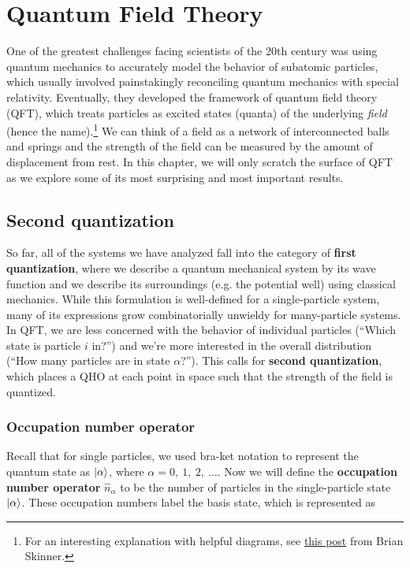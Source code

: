 %

%

\chapter{Quantum Field Theory} \label{ch:qft}
One of the greatest challenges facing scientists of the 20th century was using quantum mechanics to accurately model the behavior of subatomic particles, which usually involved painstakingly reconciling quantum mechanics with special relativity. Eventually, they developed the framework of quantum field theory (QFT), which treats particles as excited states (quanta) of the underlying \emph{field} (hence the name).\footnote{For an interesting explanation with helpful diagrams, see \href{https://www.ribbonfarm.com/2015/08/20/qft/}{this post} from Brian Skinner.} We can think of a field as a network of interconnected balls and springs and the strength of the field can be measured by the amount of displacement from rest. In this chapter, we will only scratch the surface of QFT as we explore some of its most surprising and most important results. \par 

\section{Second quantization}
So far, all of the systems we have analyzed fall into the category of \textbf{first quantization}, where we describe a quantum mechanical system by its wave function and we describe its surroundings (e.g. the potential well) using classical mechanics. While this formulation is well-defined for a single-particle system, many of its expressions grow combinatorially unwieldy for many-particle systems. In QFT, we are less concerned with the behavior of individual particles (``Which state is particle $i$ in?'') and we're more interested in the overall distribution (``How many particles are in state $\alpha$?''). This calls for \textbf{second quantization}, which places a QHO at each point in space such that the strength of the field is quantized. \par 

\subsection{Occupation number operator}
Recall that for single particles, we used bra-ket notation to represent the quantum state as $\ket{\alpha}$, where $\alpha = 0,\ 1,\ 2,\ \dots$. Now we will define the \textbf{occupation number operator} $\hat{n}_{\alpha}$ to be the number of particles in the single-particle state $\ket{\alpha}$. These occupation numbers label the basis state, which is represented as

